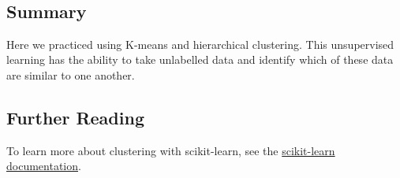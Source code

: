 \documentclass[11pt]{article}
\begin{document}
    \begin{center}
    \end{center}
    { \hspace*{\fill} \\}
    
    \hypertarget{summary}{%
\subsection{Summary}\label{summary}}

Here we practiced using K-means and hierarchical clustering. This
unsupervised learning has the ability to take unlabelled data and
identify which of these data are similar to one another.

\hypertarget{further-reading}{%
\subsection{Further Reading}\label{further-reading}}

To learn more about clustering with scikit-learn, see the
\href{https://scikit-learn.org/stable/modules/clustering.html}{scikit-learn
documentation}.


    
    
    
\end{document}

